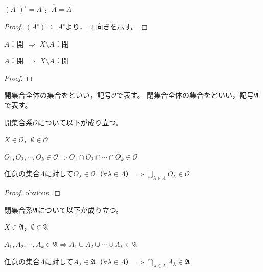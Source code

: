 \documentclass[uplatex]{jsarticle}
\begin{document}
\begin{prop}
    $\left( A^{\circ} \right)^{\circ} = A^{\circ}$，$\overline{\overline{A}} = \overline{A}$
\end{prop}

\begin{proof}
    $\left( A^{\circ} \right)^{\circ} \subseteq A^{\circ}$より，$\supseteq$向きを示す。
\end{proof}

\begin{prop}
     $A$：開 $\Longrightarrow$ $X \setminus A$：閉

     $A$：閉 $\Longrightarrow$ $X \setminus A$：開
\end{prop}

\begin{proof}
    
\end{proof}

開集合全体の集合をといい，記号$\mathcal{O}$で表す。
閉集合全体の集合をといい，記号$\mathfrak{A}$で表す。

\begin{prop}
    \label{prop:open_set_axiom}
    開集合系$\mathcal{O}$について以下が成り立つ。

     $X \in \mathcal{O}$，$\emptyset \in \mathcal{O}$

     $O_{1}, O_{2}, \cdots, O_{k} \in \mathcal{O} \Longrightarrow O_{1} \cap O_{2} \cap \cdots \cap O_{k} \in \mathcal{O}$

     任意の集合$\Lambda$に対して$O_{\lambda} \in \mathcal{O}$（$\forall \lambda \in \Lambda$） ${\displaystyle \Longrightarrow \bigcup_{\lambda \in \Lambda} O_{\lambda} \in \mathcal{O}}$
\end{prop}

\begin{proof}
     obvious.


\end{proof}

\begin{prop}
    閉集合系$\mathfrak{A}$について以下が成り立つ。
    
     $X \in \mathfrak{A}$，$\emptyset \in \mathfrak{A}$

     $A_{1}, A_{2}, \cdots, A_{k} \in \mathfrak{A} \Longrightarrow A_{1} \cup A_{2} \cup \cdots \cup A_{k} \in \mathfrak{A}$

     任意の集合$\Lambda$に対して$A_{\lambda} \in \mathfrak{A}$（$\forall \lambda \in \Lambda$） ${\displaystyle \Longrightarrow \bigcap_{\lambda \in \Lambda} A_{\lambda} \in \mathfrak{A}}$
\end{prop}
\end{document}
